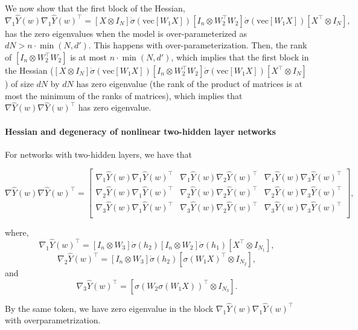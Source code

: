 \documentclass[10pt]{article}
\newcommand{\vect}{\mathrm{vec}}
\begin{document}
We now show that the first block of the Hessian,
$$
\nabla_1 \hat Y(w) \nabla_1 \hat Y(w)^\top =[X \otimes I_N] \dot\sigma(\vect[W_1X]) [I_{n} \otimes W_2^\top W_2] \dot\sigma(\vect[W_1X]) [X^\top \otimes I_N],
$$
has the zero eigenvalues when the model is over-parameterized as  $dN > n \cdot \min(N,d')$. This happens with
over-parameterization. Then, the rank of
$[I_{n} \otimes W_2^\top W_2]$ is at most $n \cdot \min(N,d')$, which
implies that the first block in the Hessian
($[X \otimes I_N] \dot\sigma(\vect[W_1X]) [I_{n} \otimes W_2^\top W_2]
\dot\sigma(\vect[W_1X]) [X^\top \otimes I_N]$) of size $dN$ by $dN$ has zero
eigenvalue (the rank of the product of matrices is at most the minimum
of the ranks of matrices), which implies that
$\nabla \hat Y(w) \nabla \hat Y(w)^\top$ has zero eigenvalue.

\paragraph{Hessian and degeneracy of  nonlinear two-hidden layer networks}

For networks with two-hidden layers, we have that 

$$
\nabla \hat Y(w) \nabla \hat Y(w)^\top = \begin{bmatrix}\nabla_{1} \hat Y(w)\nabla_{1} \hat Y(w)^\top  & \nabla_{1} \hat Y(w)\nabla_{2} \hat Y(w)^\top & \nabla_{1} \hat Y(w)\nabla_{3} \hat Y(w)^\top \\
\nabla_{2} \hat Y(w)\nabla_{1} \hat Y(w)^\top & \nabla_{2} \hat Y(w)\nabla_{2} \hat Y(w)^\top  &   \nabla_{2} \hat Y(w)\nabla_{3} \hat Y(w)^\top \\
\nabla_{3} \hat Y(w)\nabla_{1} \hat Y(w)^\top & \nabla_{3} \hat Y(w)\nabla_{2} \hat Y(w)^\top & \nabla_{3} \hat Y(w)\nabla_{3} \hat Y(w)^\top \\
\end{bmatrix},
$$

where, 
$$
\nabla_{1} \hat Y(w)^\top =[I_{n} \otimes W_{3}] \dot \sigma(h_2)[I_{n} \otimes W_{2}]  \dot \sigma(h_1) [X^\top \otimes I_{N_1}], 
$$
$$
\nabla_{2} \hat Y(w)^\top =[I_{n} \otimes W_{3}] \dot \sigma(h_2)
[\sigma(W_1X)^\top \otimes I_{N_2}],
$$
and 
$$
\nabla_{3} \hat Y(w)^\top =[\sigma(W_2\sigma(W_1X))^\top \otimes I_{N_{3}}].
$$

By the same token, we have zero eigenvalue in the block $\nabla_{1} \hat Y(w)\nabla_{1} \hat Y(w)^\top$ with overparametrization. 
\end{document}
